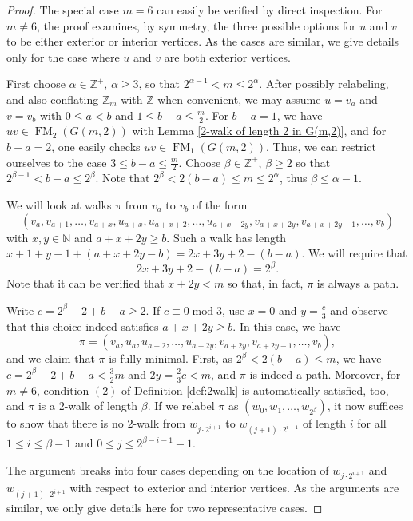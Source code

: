 \documentclass[12pt]{amsart}
\theoremstyle{definition}
\theoremstyle{remark}
\numberwithin{equation}{section}
\numberwithin{figure}{section}
\renewcommand{\mod}{\operatorname{mod}}
\newcommand{\FM}{\operatorname{FM}}
\newcommand{\N}{\mathbb{N}}
\newcommand{\Z}{\mathbb{Z}}
\begin{document}
\begin{proof} The special case $m=6$ can easily be verified by direct inspection.
    For $m\ne 6$, the proof examines, by symmetry, the three possible options for $u$ and $v$ to be either exterior or interior vertices. As the cases are similar, we give details only for the case where $u$ and $v$ are both exterior vertices. 

    First choose $\alpha\in\Z^+$, $\alpha\geq 3$, so that $2^{\alpha-1} < m \leq 2^\alpha$. After possibly relabeling, and also conflating $\Z_m$ with $\Z$ when convenient, we may assume $u=v_a$ and $v=v_b$ with $0\le a<b$ and $1\leq b-a \leq \frac{m}{2}$. For $b-a =1$, we have $uv \in \FM_2(G(m,2))$ with Lemma \ref{2-walk of length 2 in G(m,2)}, and for $b-a =2$, one easily checks $uv \in \FM_1(G(m,2))$. Thus, we can restrict ourselves to the case $3\leq b-a \leq \frac{m}{2}$. Choose $\beta\in\Z^+$, $\beta \geq 2$ so that $2^{\beta-1} < b-a \leq 2^\beta$. Note that $2^\beta < 2(b-a)\le m \le 2^\alpha$, thus $\beta\leq \alpha -1$. 

    We will look at walks $\pi$ from $v_a$ to $v_b$ of the form
    \[ (v_a, v_{a+1}, \ldots, v_{a+x},
        u_{a+x}, u_{a+x+2}, \ldots, u_{a+x+2y},
        v_{a+x+2y}, v_{a+x+2y-1}, \ldots, v_b) \]
    with $x,y\in\N$ and $a+x+2y \geq b$. Such a walk has length $x+1+y+ 1+ (a+x+2y-b) = 2x +3y +2 -(b-a)$. We will require that
    \[ 2x +3y +2 -(b-a) = 2^\beta. \]
    Note that it can be verified that $x+2y<m$ so that, in fact, $\pi$ is always a path.

    Write $c=2^\beta-2+ b-a\ge 2$. If $c\equiv 0 \mod 3$, use $x=0$ and $y=\frac{c}{3}$ and observe that this choice indeed satisfies $a+x+2y \geq b$. In this case,
    we have
    \[ \pi = (v_a,u_{a}, u_{a+2}, \ldots, u_{a+2y},
        v_{a+2y}, v_{a+2y-1}, \ldots, v_b), \]
    and we claim that $\pi$ is fully minimal. First, as $2^\beta < 2(b-a)\le m$, we have $c=2^\beta-2+ b-a < \frac 32 m$ and $2y= \frac 23 c< m$, and $\pi$ is indeed a path. Moreover, for $m\ne 6$, condition $(2)$ of Definition \ref{def:2walk} is automatically satisfied, too, and $\pi$ is a $2$-walk of length $\beta$. If we relabel $\pi$ as $(w_0,w_1,\dots,w_{2^\beta})$, it now suffices to show that there is no 
    $2$-walk from $w_{j\cdot 2^{i+1}}$ to $w_{(j+1)\cdot 2^{i+1}}$ of length $i$
    for all $1 \leq i \leq \beta-1$ and $0 \leq j \leq 2^{\beta-i-1}-1$. 

    The argument breaks into four cases depending on the location of $w_{j\cdot 2^{i+1}}$ and $w_{(j+1)\cdot 2^{i+1}}$ with respect to exterior and interior vertices. As the arguments are similar, we only give details here for two representative cases.
    

\end{proof}
\end{document}
